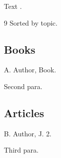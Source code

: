 \documentclass{article}
\begin{document}
Text \cite{a,b}.
\begin{thebibliography}{9}
Sorted by topic.

\subsection*{Books}
 A. Author, Book.

Second para.
\subsection*{Articles}
 B. Author, J. 2.

Third para.
\end{thebibliography}
\end{document}

